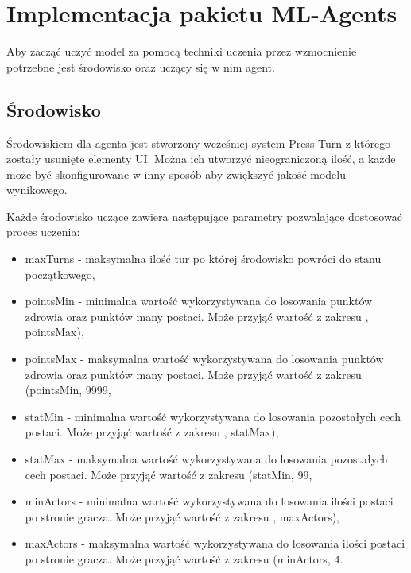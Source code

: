 \documentclass{SGGW-thesis}
\begin{document}
\section{Implementacja pakietu ML-Agents}
Aby zacząć uczyć model za pomocą techniki uczenia przez wzmocnienie potrzebne jest środowisko oraz uczący się w nim agent.
\subsection{Środowisko}
Środowiskiem dla agenta jest stworzony wcześniej system Press Turn z którego zostały usunięte elementy UI. Można ich utworzyć nieograniczoną ilość, a każde może być skonfigurowane w inny sposób aby zwiększyć jakość modelu wynikowego.

\pagebreak
Każde środowisko uczące zawiera następujące parametry pozwalające dostosować proces uczenia:
\begin{itemize}
  \item{maxTurns - maksymalna ilość tur po której środowisko powróci do stanu początkowego},
  \item{pointsMin - minimalna wartość wykorzystywana do losowania punktów zdrowia oraz punktów many postaci. Może przyjąć wartość z zakresu , pointsMax)},
  \item{pointsMax - maksymalna wartość wykorzystywana do losowania punktów zdrowia oraz punktów many postaci. Może przyjąć wartość z zakresu (pointsMin, 9999\textrangle},
  \item{statMin - minimalna wartość wykorzystywana do losowania pozostałych cech postaci. Może przyjąć wartość z zakresu , statMax)},
  \item{statMax - maksymalna wartość wykorzystywana do losowania pozostałych cech postaci. Może przyjąć wartość z zakresu (statMin, 99\textrangle},
  \item{minActors - minimalna wartość wykorzystywana do losowania ilości postaci po stronie gracza. Może przyjąć wartość z zakresu , maxActors)},
  \item{maxActors - maksymalna wartość wykorzystywana do losowania ilości postaci po stronie gracza. Może przyjąć wartość z zakresu (minActors, 4\textrangle}.
\end{itemize}
\end{document}
